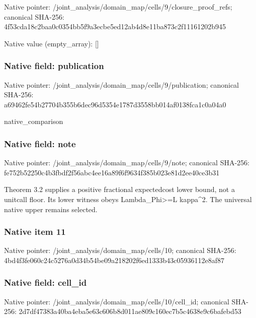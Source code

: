 \documentclass[10pt,a4paper]{article}
\begin{document}
Native pointer: /joint\_analysis/domain\_m\allowbreak{}ap/cells/9/closure\_proof\allowbreak{}\_refs; canonical SHA-256: 4f53cda18c2baa0c0354bb5f\allowbreak{}9a3ecbe5ed12ab4d8e11ba87\allowbreak{}3c2f11161202b945



Native value (empty\_array): []



\subsubsection{Native field: publication}


Native pointer: /joint\_analysis/domain\_m\allowbreak{}ap/cells/9/publication; canonical SHA-256: a69462fe54b27704b355b6de\allowbreak{}c96d5354e1787d3558bb014a\allowbreak{}f0138fca1c0a04a0


native\_comparison


\subsubsection{Native field: note}


Native pointer: /joint\_analysis/domain\_map/cells/9/note; canonical SHA-256: fe752b52250c4b3fbdf2f56a\allowbreak{}bc4ee16a89f6f9634f385b02\allowbreak{}3e81d2ee40ce3b31


Theorem 3.2 supplies a positive fractional expectedcost lower bound, not a unitcall floor. Its lower witness obeys Lambda\_Phi>=L kappa\textasciicircum{}2. The universal native upper remains selected.


\subsubsection{Native item 11}


Native pointer: /joint\_analysis/domain\_map/cells/10; canonical SHA-256: 4bd4f3fe060c24c5276a0d34\allowbreak{}b54be09a218202f6ed1333b4\allowbreak{}3c05936112e8af87



\subsubsection{Native field: cell\_id}


Native pointer: /joint\_analysis/domain\_m\allowbreak{}ap/cells/10/cell\_id; canonical SHA-256: 2d7df47383a40ba4eba5e63c\allowbreak{}606b8d011ae809c160ec7b5c\allowbreak{}4638e9c6bafebd53
\end{document}
